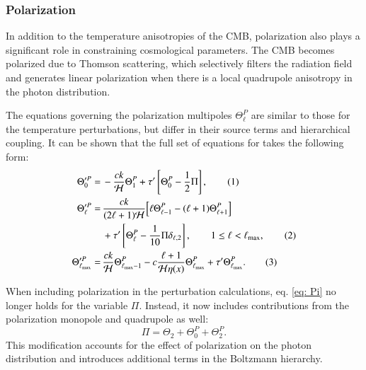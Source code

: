 \documentclass{aa}
\newcommand\numberthis{\addtocounter{equation}{1}\tag{\theequation}}
\numberwithin{equation}{section}
\numberwithin{table}{section}
\numberwithin{figure}{section}
\begin{document}
\subsubsection{Polarization}
In addition to the temperature anisotropies of the CMB, polarization also plays a significant role in constraining cosmological parameters. The CMB becomes polarized due to Thomson scattering, which selectively filters the radiation field and generates linear polarization when there is a local quadrupole anisotropy in the photon distribution.

The equations governing the polarization multipoles $\Theta^P_\ell$ are similar to those for the temperature perturbations, but differ in their source terms and hierarchical coupling. It can be shown that the full set of equations for takes the following form: 
\begin{align*} 
  \Theta'^P_0 =\, &-\frac{ck}{\mathcal{H}} \Theta^P_1 + \tau' \left[ \Theta^P_{0} - \frac{1}{2} \Pi \right], \numberthis \\ 
  \Theta'^P_{\ell} =\, &\frac{ck}{(2\ell+1)\mathcal{H}} \Big[\ell\Theta^P_{\ell-1} - (\ell+1)\Theta^P_{\ell+1}\Big] \\
  &+ \tau' \left[ \Theta^P_{\ell} - \frac{1}{10} \Pi \delta_{\ell,2} \right], \qquad 1 \leq \ell < \ell_{\max}, \numberthis \\ 
  \Theta'^P_{\ell_{\max}} =\, &\frac{ck}{\mathcal{H}} \Theta^P_{\ell_{\max}-1} - c \frac{\ell+1}{\mathcal{H}\eta(x)} \Theta^P_{\ell_{\max}} + \tau' \Theta^P_{\ell_{\max}}. \numberthis
\end{align*}

When including polarization in the perturbation calculations, eq. \eqref{eq: Pi} no longer holds for the variable $\Pi$. Instead, it now includes contributions from the polarization monopole and quadrupole as well: 
\begin{equation} 
  \Pi = \Theta_2 + \Theta^P_{0} + \Theta^P_{2}. 
\end{equation}
This modification accounts for the effect of polarization on the photon distribution and introduces additional terms in the Boltzmann hierarchy. 
\end{document}
